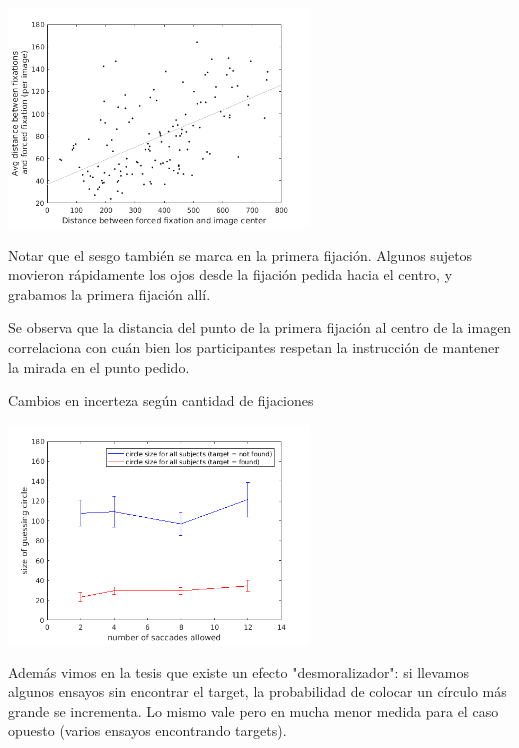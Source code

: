 \documentclass[compress]{beamer}
\begin{document}
\begin{frame}

\begin{center}
\includegraphics[width=0.6\textwidth]{images/scatter-first-fixation.png}
\end{center}

{\scriptsize
Notar que el sesgo también se marca en la primera fijación. Algunos sujetos movieron rápidamente los ojos desde la fijación pedida hacia el centro, y grabamos la primera fijación allí.}

\bigskip

{\scriptsize Se observa que la distancia del punto de la primera fijación al centro de la imagen correlaciona con cuán bien los participantes respetan la instrucción de mantener la mirada en el punto pedido.}
\end{frame}

\begin{frame}{Cambios en incerteza según cantidad de fijaciones}
\begin{center}
\includegraphics[width=0.6\textwidth]{images/mean_circle_size.png}
\end{center}

{\scriptsize
Además vimos en la tesis que existe un efecto "desmoralizador": si llevamos algunos ensayos sin encontrar el target, la probabilidad de colocar un círculo más grande se incrementa. Lo mismo vale pero en mucha menor medida para el caso opuesto (varios ensayos encontrando targets).}
\end{frame}
\end{document}
